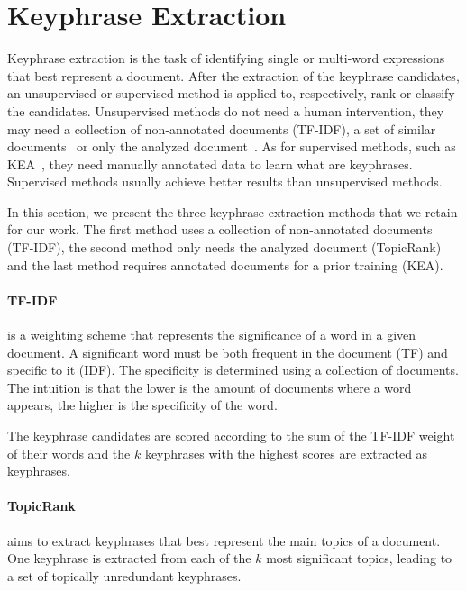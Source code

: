 \section{Keyphrase Extraction}
\label{sec:keyphrase_extraction}
  Keyphrase extraction is the task of identifying single or multi-word
  expressions that best represent a document. After the extraction of the
  keyphrase candidates, an unsupervised or supervised method is applied to,
  respectively, rank or classify the candidates. Unsupervised methods do not
  need a human intervention, they may need a collection of non-annotated
  documents (TF-IDF), a set of similar
  documents~\cite[ExpandRank]{wan2008expandrank} or only the analyzed
  document~\cite[TopicRank]{bougouin2013topicrank}. As for supervised methods,
  such as KEA~\cite{witten1999kea}, they need manually annotated data to learn
  what are keyphrases. Supervised methods usually achieve better results than
  unsupervised methods.

  In this section, we present the three keyphrase extraction methods that we
  retain for our work. The first method uses a collection of non-annotated
  documents (TF-IDF), the second method only needs the analyzed document
  (TopicRank) and the last method requires annotated documents for a prior
  training (KEA).

  \paragraph{TF-IDF} is a weighting scheme that represents the significance of a
  word in a given document. A significant word must be both frequent in the
  document (TF) and specific to it (IDF). The specificity is determined using a
  collection of documents. The intuition is that the lower is the amount of
  documents where a word appears, the higher is the specificity of the word.

  The keyphrase candidates are scored according to the sum of the TF-IDF weight
  of their words and the $k$ keyphrases with the highest scores are extracted as
  keyphrases.

  \paragraph{TopicRank} aims to extract keyphrases that best represent the main
  topics of a document. One keyphrase is extracted from each of the $k$ most
  significant topics, leading to a set of topically unredundant keyphrases.

